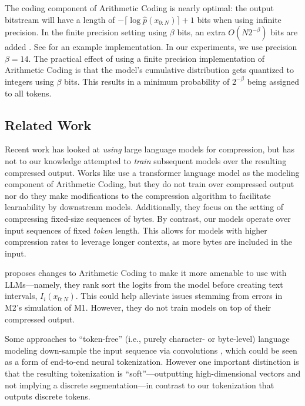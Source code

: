 The coding component of Arithmetic Coding is nearly optimal: the output bitstream will have a length of $-\lceil \log \hat{p}(x_{0:N}) \rceil + 1$ bits when using infinite precision. In the finite precision setting using $\beta$ bits, an extra $O(N2^{-\beta})$ bits are added \cite{howardAnalysisArithmeticCoding1992}. See \citet{wittenArithmeticCodingData1987} for an example implementation. In our experiments, we use precision $\beta=14$. The practical effect of using a finite precision implementation of Arithmetic Coding is that the model's cumulative distribution gets quantized to integers using $\beta$ bits. This results in a minimum probability of $2^{-\beta}$ being assigned to all tokens.

\subsection{Related Work}

Recent work has looked at \textit{using} large language models for compression, but has not to our knowledge attempted to \textit{train} subsequent models over the resulting compressed output. Works like \citet{deletangLanguageModelingCompression2024} use a transformer language model as the modeling component of Arithmetic Coding, but they do not train over compressed output nor do they make modifications to the compression algorithm to facilitate learnability by downstream models. Additionally, they focus on the setting of compressing fixed-size sequences of bytes. By contrast, our models operate over input sequences of fixed \emph{token} length. This allows for models with higher compression rates to leverage longer contexts, as more bytes are included in the input.

\citet{valmeekamLLMZipLosslessText2023} proposes changes to Arithmetic Coding to make it more amenable to use with LLMs---namely, they rank sort the logits from the model before creating text intervals, $I_i(x_{0:N})$. This could help alleviate issues stemming from errors in M2's simulation of M1\@. However, they do not train models on top of their compressed output.

Some approaches to ``token-free'' (i.e., purely character- or byte-level) language modeling down-sample the input sequence via convolutions \cite{clark-etal-2022-canine, tay2022charformer}, which could be seen as a form of end-to-end neural tokenization. However one important distinction is that the resulting tokenization is ``soft''---outputting high-dimensional vectors and not implying a discrete segmentation---in contrast to our tokenization that outputs discrete tokens. 

